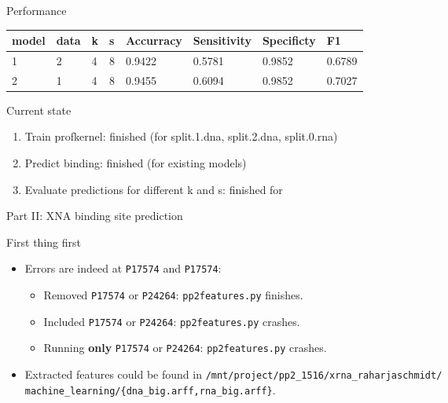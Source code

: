 \documentclass[pdf]
{beamer}
\begin{document}
\begin{frame}{Performance}
	\begin{center}
\begin{tabular}{|l|l|l|l|l|l|l|l|}
\hline
model & data & k & s & Accurracy & Sensitivity & Specificty & F1 \\
\hline
1 & 2 & 4 & 8 &  0.9422 & 0.5781     &   0.9852 & 0.6789 \\
\hline
2 & 1 & 4 & 8 &   0.9455 & 0.6094 &       0.9852 &  0.7027 \\
\hline



\end{tabular}
\end{center}
\end{frame}

\begin{frame}{Current state}
	\begin{center}
	\begin{enumerate}
	\item Train profkernel: finished (for split.1.dna, split.2.dna, split.0.rna)
	\item Predict binding: finished (for existing models)
	\item Evaluate predictions for different k and s: finished for
	\end{enumerate}
	\end{center}
\end{frame}

\begin{frame}
	\begin{center}
		\Large Part II: XNA binding site prediction
	\end{center}
\end{frame}

\begin{frame}{First thing first}
	\begin{itemize}
		\item Errors are indeed at \texttt{P17574} and \texttt{P17574}:
		\begin{itemize}
			\item Removed \texttt{P17574} or \texttt{P24264}: \texttt{pp2features.py} finishes.
			\item Included \texttt{P17574} or \texttt{P24264}: \texttt{pp2features.py} crashes.
			\item Running \textbf{only} \texttt{P17574} or \texttt{P24264}: \texttt{pp2features.py} crashes.
		\end{itemize}
		\item Extracted features could be found in \texttt{/mnt/project/pp2\_1516/xrna\_raharjaschmidt/} \texttt{machine\_learning/\{dna\_big.arff,rna\_big.arff\}}.
	\end{itemize}
\end{frame}
\end{document}
